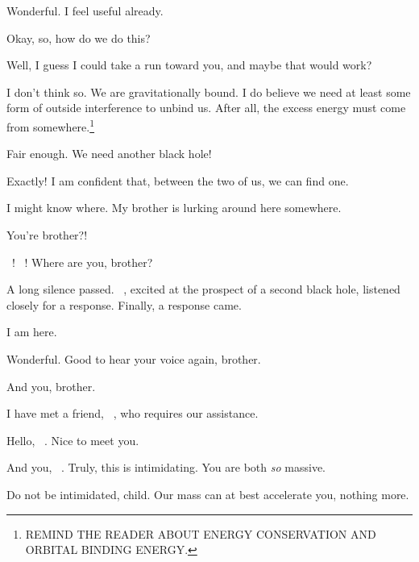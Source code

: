 \documentclass[main.tex]{subfiles}
\begin{document}
\par \Ares Wonderful.  I feel useful already.

\par \Sterope Okay, so, how do we do this?

\par \Ares Well, I guess I could take a run toward you, and maybe that would work?

\par \Sterope I don't think so.  We are gravitationally bound.  I do believe we need at least some form of outside interference to unbind us.  After all, the excess energy must come from somewhere.\footnote{REMIND THE READER ABOUT ENERGY CONSERVATION AND ORBITAL BINDING ENERGY.}

\par \Ares Fair enough.  We need another black hole!

\par \Sterope Exactly!  I am confident that, between the two of us, we can find one.

\par \Ares I might know where.  My brother is lurking around here somewhere. 

\par \Sterope You're brother?!

\par \Ares \rmzeus~! \rmzeus~!  Where are you, brother?

\par \nar A long silence passed.  \rmsterope~, excited at the prospect of a second black hole, listened closely for a response.  Finally, a response came.

\par \Zeus I am here.   

\par \Ares  Wonderful.  Good to hear your voice again, brother.

\par \Zeus And you, brother.

\par \Ares I have met a friend, \rmsterope~, who requires our assistance.

\par \Zeus  Hello, \rmsterope~.  Nice to meet you.

\par \Sterope And you, \rmzeus~.  Truly, this is intimidating.  You are both \textit{so} massive.

\par \Zeus Do not be intimidated, child.  Our mass can at best accelerate you, nothing more.
\end{document}
